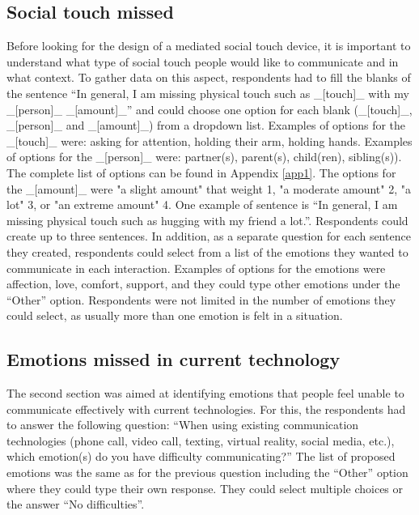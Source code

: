 \documentclass[acmsmall]{acmart}
\begin{document}
\subsection{Social touch missed}
Before looking for the design of a mediated social touch device, it is important to understand what type of social touch people would like to communicate and in what context. To gather data on this aspect, respondents had to fill the blanks of the sentence “In general, I am missing physical touch such as \_[touch]\_ with my \_[person]\_ \_[amount]\_” and could choose one option for each blank (\_[touch]\_, \_[person]\_ and \_[amount]\_) from a dropdown list. Examples of options for the \_[touch]\_ were: asking for attention, holding their arm, holding hands. Examples of options for the \_[person]\_ were: partner(s), parent(s), child(ren), sibling(s)). The complete list of options can be found in Appendix \ref{app1}. The options for the \_[amount]\_ were "a slight amount" that weight 1, "a moderate amount" 2, "a lot" 3, or "an extreme amount" 4. One example of sentence is “In general, I am missing physical touch such as hugging with my friend a lot.”. Respondents could create up to three sentences. In addition, as a separate question for each sentence they created, respondents could select from a list of the emotions they wanted to communicate in each interaction. Examples of options for the emotions were affection, love, comfort, support, and they could type other emotions under the “Other” option. Respondents were not limited in the number of emotions they could select, as usually more than one emotion is felt in a situation. 

\subsection{Emotions missed in current technology}
The second section was aimed at identifying emotions that people feel unable to communicate effectively with current technologies.  For this, the respondents had to answer the following question: ``When using existing communication technologies (phone call, video call, texting, virtual reality, social media, etc.), which emotion(s) do you have difficulty communicating?'' The list of proposed emotions was the same as for the previous question including the “Other” option where they could type their own response. They could select multiple choices or the answer “No difficulties”.
\end{document}
